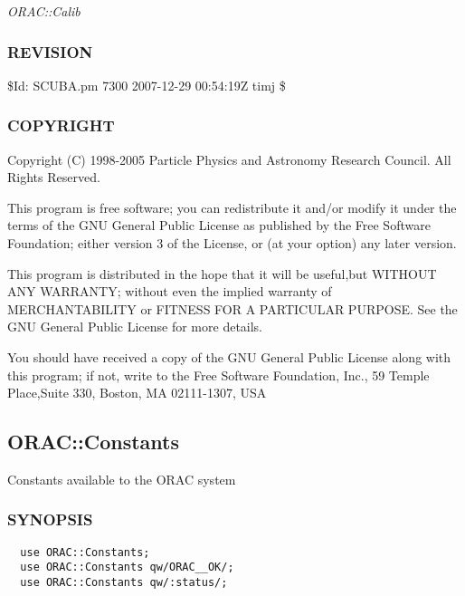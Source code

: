 \emph{ORAC::Calib}

\subsubsection*{REVISION\label{ORAC::Calib::SCUBA_REVISION}}


\$Id: SCUBA.pm 7300 2007-12-29 00:54:19Z timj \$

\subsubsection*{COPYRIGHT\label{ORAC::Calib::SCUBA_COPYRIGHT}}


Copyright (C) 1998-2005 Particle Physics and Astronomy Research
Council. All Rights Reserved.



This program is free software; you can redistribute it and/or modify it under
the terms of the GNU General Public License as published by the Free Software
Foundation; either version 3 of the License, or (at your option) any later
version.



This program is distributed in the hope that it will be useful,but WITHOUT ANY
WARRANTY; without even the implied warranty of MERCHANTABILITY or FITNESS FOR A
PARTICULAR PURPOSE. See the GNU General Public License for more details.



You should have received a copy of the GNU General Public License along with
this program; if not, write to the Free Software Foundation, Inc., 59 Temple
Place,Suite 330, Boston, MA  02111-1307, USA

\subsection{ORAC::Constants\label{ORAC::Constants}}


Constants available to the ORAC system

\subsubsection*{SYNOPSIS\label{ORAC::Constants_SYNOPSIS}}
\begin{verbatim}
  use ORAC::Constants;
  use ORAC::Constants qw/ORAC__OK/;
  use ORAC::Constants qw/:status/;
\end{verbatim}
